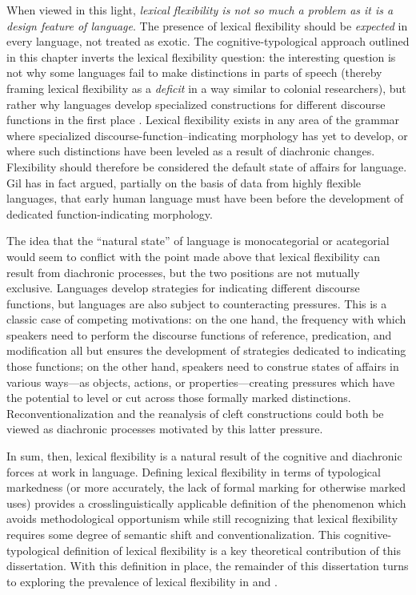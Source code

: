 When viewed in this light, \emph{lexical flexibility is not so much a problem as it is a design feature of language}. The presence of lexical flexibility should be \emph{expected} in every language, not treated as exotic. The cognitive-typological approach outlined in this chapter inverts the lexical flexibility question: the interesting question is not why some languages fail to make distinctions in parts of speech (thereby framing lexical flexibility as a \emph{deficit} in a way similar to colonial researchers), but rather why languages develop specialized constructions for different discourse functions in the first place . Lexical flexibility exists in any area of the grammar where specialized discourse-function–indicating morphology has yet to develop, or where such distinctions have been leveled as a result of diachronic changes. Flexibility should therefore be considered the default state of affairs for language. Gil \parencites*{Gil2005}{Gil2006} has in fact argued, partially on the basis of data from highly flexible languages, that early human language must have been  before the development of dedicated function-indicating morphology.

The idea that the \enquote{natural state} of language is monocategorial or acategorial would seem to conflict with the point made above that lexical flexibility can result from diachronic processes, but the two positions are not mutually exclusive. Languages develop strategies for indicating different discourse functions, but languages are also subject to counteracting pressures. This is a classic case of competing motivations: on the one hand, the frequency with which speakers need to perform the discourse functions of reference, predication, and modification all but ensures the development of strategies dedicated to indicating those functions; on the other hand, speakers need to construe states of affairs in various ways—as objects, actions, or properties—creating pressures which have the potential to level or cut across those formally marked distinctions. Reconventionalization and the reanalysis of cleft constructions could both be viewed as diachronic processes motivated by this latter pressure.

In sum, then, lexical flexibility is a natural result of the cognitive and diachronic forces at work in language. Defining lexical flexibility in terms of typological markedness (or more accurately, the lack of formal marking for otherwise marked uses) provides a crosslinguistically applicable definition of the phenomenon which avoids methodological opportunism while still recognizing that lexical flexibility requires some degree of semantic shift and conventionalization. This cognitive-typological definition of lexical flexibility is a key theoretical contribution of this dissertation. With this definition in place, the remainder of this dissertation turns to exploring the prevalence of lexical flexibility in  and .
